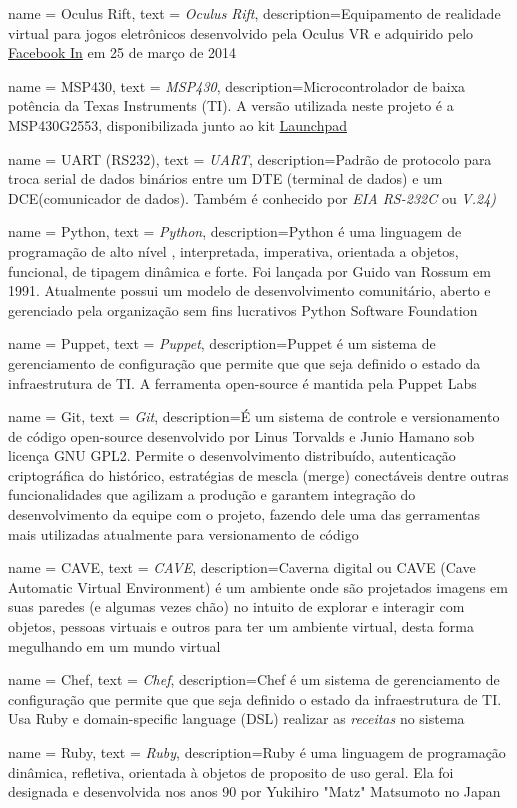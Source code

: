 {
	name = Oculus Rift,
	text = \textit{Oculus Rift},
	description={Equipamento de realidade virtual para jogos eletrônicos desenvolvido pela Oculus VR e adquirido pelo \href{https://www.facebook.com/facebook}{Facebook In} em 25 de março de 2014}
}

{
	name = MSP430,
	text = \textit{MSP430},
	description={Microcontrolador de baixa potência da Texas Instruments (TI). A versão utilizada neste projeto é a MSP430G2553, disponibilizada junto ao kit \href{http://www.ti.com/tool/msp-exp430g2}{Launchpad}}
}

{
	name = UART (RS232),
	text = \textit{UART},
	description={Padrão de protocolo para troca serial de dados binários entre um DTE (terminal de dados) e um DCE(comunicador de dados). Também é conhecido por \textit{EIA RS-232C} ou \textit{V.24)}}
}

{
	name = Python,
	text = \textit{Python},
	description={Python é uma linguagem de programação de alto nível , interpretada, imperativa, orientada a objetos, funcional, de tipagem dinâmica e forte. Foi lançada por Guido van Rossum em 1991\cite{python_history}. Atualmente possui um modelo de desenvolvimento comunitário, aberto e gerenciado pela organização sem fins lucrativos Python Software Foundation}
}

{
	name = Puppet,
	text = \textit{Puppet},
	description={Puppet é um sistema de gerenciamento de configuração que permite que que seja definido o estado da infraestrutura de TI. A ferramenta open-source é mantida pela Puppet Labs}
}

{
	name = Git,
	text = \textit{Git},
	description={É um sistema de controle e versionamento de código open-source desenvolvido por Linus Torvalds e Junio Hamano sob licença GNU GPL2. Permite o desenvolvimento distribuído, autenticação criptográfica do histórico, estratégias de mescla (merge) conectáveis dentre outras funcionalidades que agilizam a produção e garantem integração do desenvolvimento da equipe com o projeto, fazendo dele uma das gerramentas mais utilizadas atualmente para versionamento de código}
}

{
	name = CAVE,
	text = \textit{CAVE},
	description={Caverna digital ou CAVE (Cave Automatic Virtual Environment) é um ambiente onde são projetados imagens em suas paredes (e algumas vezes chão) no intuito de explorar e interagir com objetos, pessoas virtuais e outros para ter um ambiente virtual, desta forma megulhando em um mundo virtual}
}

{
	name = Chef,
	text = \textit{Chef},
	description={Chef é um sistema de gerenciamento de configuração que permite que que seja definido o estado da infraestrutura de TI. Usa Ruby e  domain-specific language (DSL) realizar as \textit{receitas} no sistema}
}

{
	name = Ruby,
	text = \textit{Ruby},
	description={Ruby é uma linguagem de programação dinâmica, refletiva, orientada à objetos de proposito de uso geral. Ela foi designada e desenvolvida nos anos 90 por Yukihiro "Matz" Matsumoto no Japan}
}

